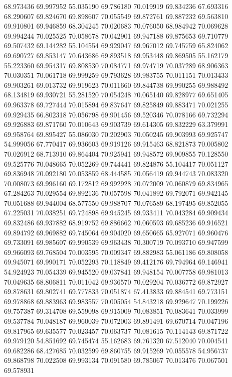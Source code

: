 68.973436
69.997952
55.035190
69.786180
70.019919
69.834236
67.693316
68.290607
69.824670
69.898607
70.055549
69.872761
69.887232
69.563810
69.910801
69.946859
68.304245
70.020683
70.076050
68.984942
70.069628
69.994244
70.025525
70.058678
70.042901
69.947188
69.875653
69.710779
69.507432
69.144282
55.104554
69.929047
69.967012
69.745759
65.824062
69.690727
69.853147
70.643686
69.893518
69.953448
69.869505
55.162179
55.223360
69.954317
69.808530
70.084771
69.974719
70.037289
68.906363
70.030351
70.061718
69.999259
69.793628
69.983755
70.011151
70.013433
69.903261
69.013732
69.919623
70.011660
69.844738
69.990255
69.988492
68.134819
69.930721
55.281520
70.054248
70.065140
69.828977
69.651405
69.963378
69.727444
70.015894
69.837647
69.825849
69.883471
70.021255
69.929435
66.802318
70.056798
69.901456
69.520346
70.078166
69.732294
69.926883
69.871760
70.010643
69.903739
69.614305
69.832229
63.379991
69.958764
69.895427
55.086030
70.202903
70.050245
69.903993
69.925747
54.999056
67.770417
69.936603
69.919126
69.915463
68.821873
70.005802
70.026912
68.713910
69.864404
70.925941
69.948572
69.909855
70.128550
69.525776
70.048665
70.052269
69.744441
69.824876
55.104417
70.051127
69.836948
70.092180
70.053859
68.444585
70.056419
69.944743
70.083320
70.008073
69.996160
69.172812
69.992928
70.072009
70.060879
69.834965
67.284263
70.029554
69.892136
70.057598
70.041892
69.792071
69.942145
70.051688
69.944004
68.577550
69.988707
70.076589
68.197495
69.852055
67.225031
70.038251
69.724898
69.945245
69.933411
70.043284
69.909434
69.832486
69.937882
68.919752
69.886662
70.060593
69.685236
69.916521
69.894792
69.969882
69.745064
69.904020
69.650665
65.927071
69.960476
69.733091
69.985607
69.990539
69.963438
70.300719
70.093710
69.947599
69.966093
69.768504
70.003595
70.009347
69.882983
55.061186
69.808058
69.945071
69.990171
70.052293
70.118849
69.412176
69.794964
69.146941
54.924923
70.054339
69.945520
69.037841
69.948154
70.007758
69.981013
70.049635
68.806811
70.011042
69.936570
70.029204
70.036772
69.872927
69.878631
69.802741
69.777833
70.051874
67.413833
69.884541
69.773151
69.978868
69.883963
69.983557
70.005054
54.843218
69.929647
70.199226
69.757387
69.314708
69.559098
69.915009
70.083851
70.083641
70.033999
69.537784
70.048187
69.960039
70.072003
69.891491
69.670714
70.047196
69.817965
69.635577
70.023457
70.063737
70.081615
70.114143
69.871722
69.979120
54.851692
69.745474
55.162683
69.761320
67.512040
70.004541
69.682286
68.427685
70.032599
69.860755
69.915269
70.055578
54.956737
69.868798
70.022508
69.993134
70.091580
69.785067
70.013476
70.067501
69.578931
